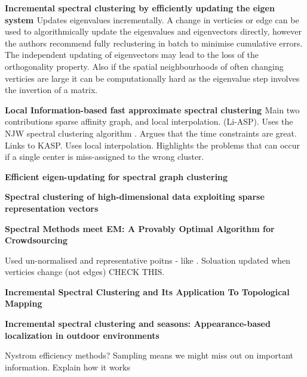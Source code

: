 \documentclass[10pt]{report}
\begin{document}
\textbf{Incremental spectral clustering by efficiently updating the eigen system \citep{Ning2010}} Updates eigenvalues incrementally. A change in verticies or edge can be used to algorithmically update the eigenvalues and eigenvectors directly, however the authors recommend fully reclustering in batch to minimise cumulative errors. The independent updating of eigenvectors may lead to the loss of the orthogonality property. Also if the spatial neighbourhoods of often changing verticies are large it can be computationally hard as the eigenvalue step involves the invertion of a matrix.

\textbf{Local Information-based fast approximate spectral clustering \citep{Cao2014}} Main two contributions sparse affinity graph, and local interpolation. (Li-ASP). Uses the NJW spectral clustering algorithm \citep{Ng2001}. Argues that the time constraints are great. Links to KASP. Uses local interpolation. Highlights the problems that can occur if a single center is miss-assigned to the wrong cluster. 

\textbf{Efficient eigen-updating for spectral graph clustering \citep{Dhanjal2014} }

\textbf{Spectral clustering of high-dimensional data exploiting sparse representation vectors \citep{Wu2014}}

\textbf{Spectral Methods meet EM: A Provably Optimal Algorithm for Crowdsourcing \citep{Zhang2014}}


\citep{Kannan2004}

\citep{Guattery1998}
\citep{Hagen1992}

\citep{Meila2001}

\citep{Pothen1990}

\citep{Stoer1997}

\citep{Tibshirani2001}

\citep{Luxburg2005}

\citep{Luxburg2007}

\citep{Dhanjal2011}

 \citep{Kong2011} Used un-normalised and representative poitns - like \citep{Yan2009}. Soluation updated when verticies change (not edges) CHECK THIS. 

\textbf{Incremental Spectral Clustering and Its Application To Topological Mapping \citep{Valgren2007}} 

\textbf{Incremental spectral clustering and seasons: Appearance-based localization in outdoor environments \citep{Valgren2008}}

\citep{Ning2007}

Nystrom efficiency methods?  Sampling means we might miss out on important information. Explain how it works \citep{Williams2001} \citep{Fowlkes2004}



\pagebreak


\end{document}
